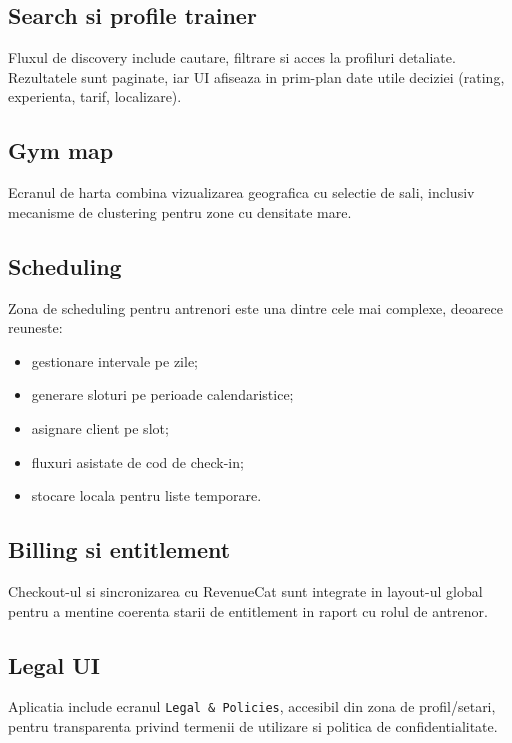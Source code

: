 \subsection{Search si profile trainer}

Fluxul de discovery include cautare, filtrare si acces la profiluri detaliate. Rezultatele sunt paginate, iar UI afiseaza in prim-plan date utile deciziei (rating, experienta, tarif, localizare).

\subsection{Gym map}

Ecranul de harta combina vizualizarea geografica cu selectie de sali, inclusiv mecanisme de clustering pentru zone cu densitate mare.

\subsection{Scheduling}

Zona de scheduling pentru antrenori este una dintre cele mai complexe, deoarece reuneste:
\begin{itemize}[leftmargin=1.2cm]
    \item gestionare intervale pe zile;
    \item generare sloturi pe perioade calendaristice;
    \item asignare client pe slot;
    \item fluxuri asistate de cod de check-in;
    \item stocare locala pentru liste temporare.
\end{itemize}

\subsection{Billing si entitlement}

Checkout-ul si sincronizarea cu RevenueCat sunt integrate in layout-ul global pentru a mentine coerenta starii de entitlement in raport cu rolul de antrenor.

\subsection{Legal UI}

Aplicatia include ecranul \texttt{Legal \& Policies}, accesibil din zona de profil/setari, pentru transparenta privind termenii de utilizare si politica de confidentialitate.

